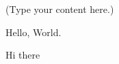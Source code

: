 \documentclass{article}
\begin{document}
(Type your content here.)

Hello, World.



Hi there
\end{document}
